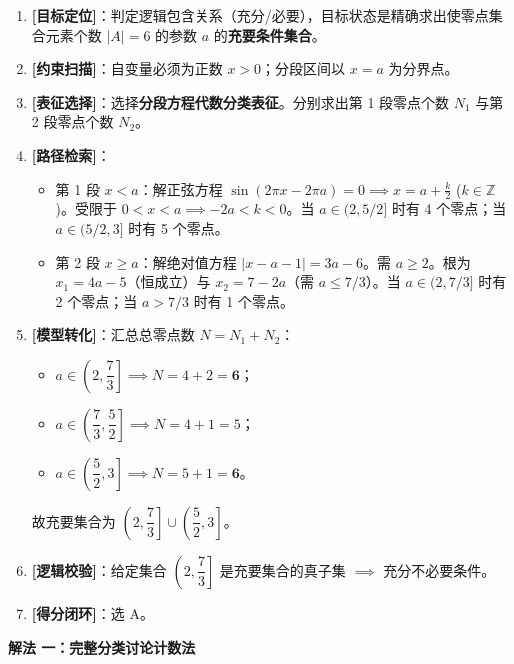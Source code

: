 \documentclass[11pt,a4paper,fontset=fandol]{ctexart}
\newcommand{\method}[1]{\par\medskip\noindent\textbf{解法 #1}\par}
\begin{document}
\medskip
\begin{tcolorbox}[colback=gray!4,colframe=ink!70,boxrule=0.7pt,arc=1mm,before skip=6pt,after skip=6pt,top=4pt,bottom=4pt,title=\textbf{决策路线}]
\begin{enumerate}[label=\textbf{\arabic*\ },leftmargin=1.8em]
  \item \textbf{[目标定位]}：判定逻辑包含关系（充分/必要），目标状态是精确求出使零点集合元素个数 \(|A|=6\) 的参数 \(a\) 的\textbf{充要条件集合}。
  \item \textbf{[约束扫描]}：自变量必须为正数 \(x > 0\)；分段区间以 \(x=a\) 为分界点。
  \item \textbf{[表征选择]}：选择\textbf{分段方程代数分类表征}。分别求出第 1 段零点个数 \(N_1\) 与第 2 段零点个数 \(N_2\)。
  \item \textbf{[路径检索]}：
    \begin{itemize}
      \item 第 1 段 \(x < a\)：解正弦方程 \(\sin(2\pi x - 2\pi a) = 0 \implies x = a + \frac{k}{2}\) (\(k \in \mathbb{Z}\))。受限于 \(0 < x < a \implies -2a < k < 0\)。当 \(a \in (2, 5/2]\) 时有 4 个零点；当 \(a \in (5/2, 3]\) 时有 5 个零点。
      \item 第 2 段 \(x \ge a\)：解绝对值方程 \(|x - a - 1| = 3a - 6\)。需 \(a \ge 2\)。根为 \(x_1 = 4a - 5\)（恒成立）与 \(x_2 = 7 - 2a\)（需 \(a \le 7/3\)）。当 \(a \in (2, 7/3]\) 时有 2 个零点；当 \(a > 7/3\) 时有 1 个零点。
    \end{itemize}
  \item \textbf{[模型转化]}：汇总总零点数 \(N = N_1 + N_2\)：
    \begin{itemize}
      \item \(a \in \left(2, \dfrac{7}{3}\right] \implies N = 4 + 2 = \mathbf{6}\)；
      \item \(a \in \left(\dfrac{7}{3}, \dfrac{5}{2}\right] \implies N = 4 + 1 = 5\)；
      \item \(a \in \left(\dfrac{5}{2}, 3\right] \implies N = 5 + 1 = \mathbf{6}\)。
    \end{itemize}
    故充要集合为 \(\left(2, \dfrac{7}{3}\right] \cup \left(\dfrac{5}{2}, 3\right]\)。
  \item \textbf{[逻辑校验]}：给定集合 \(\left(2, \dfrac{7}{3}\right]\) 是充要集合的真子集 \(\implies\) 充分不必要条件。
  \item \textbf{[得分闭环]}：选 A。
\end{enumerate}
\end{tcolorbox}

\method{一：完整分类讨论计数法}
\end{document}
